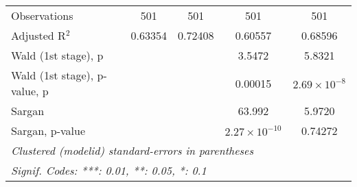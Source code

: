 \begin{tabular}{lcccc}
   Observations                 & 501                                         & 501                    & 501                   & 501                  \\
   Adjusted R$^2$               & 0.63354                                     & 0.72408                & 0.60557               & 0.68596              \\
   Wald (1st stage), p          &                                             &                        & 3.5472                & 5.8321               \\
   Wald (1st stage), p-value, p &                                             &                        & 0.00015               & $2.69\times 10^{-8}$ \\
   Sargan                       &                                             &                        & 63.992                & 5.9720               \\
   Sargan, p-value              &                                             &                        & $2.27\times 10^{-10}$ & 0.74272              \\
   \midrule \midrule
   \multicolumn{5}{l}{\emph{Clustered (modelid) standard-errors in parentheses}}                                                                      \\
   \multicolumn{5}{l}{\emph{Signif. Codes: ***: 0.01, **: 0.05, *: 0.1}}                                                                              \\
\end{tabular}
\par\endgroup


